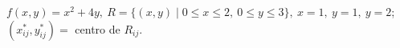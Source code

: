 \item $f(x, y) = x^2 + 4y, \ R = \{(x, y) \mid 0 \le x \le 2, \ 0 \le y \le 3\}, \ x = 1, \ y = 1, \ y = 2$; \\ $(x_{ij}^*, y_{ij}^*) =$ centro de $R_{ij}$.
